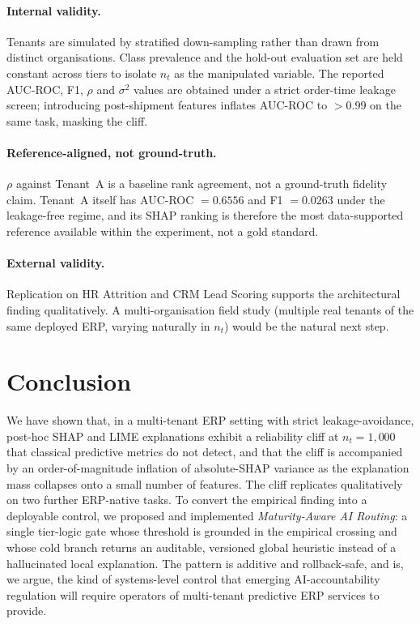 \documentclass[conference]{IEEEtran}
\newcommand{\auc}{AUC\nobreakdash-ROC}
\newcommand{\nT}{n_t}
\begin{document}
\paragraph*{Internal validity.} Tenants are simulated by stratified
down-sampling rather than drawn from distinct organisations. Class
prevalence and the hold-out evaluation set are held constant across
tiers to isolate $\nT$ as the manipulated variable. The reported
\auc{}, F1, $\rho$ and $\sigma^2$ values are obtained under a strict
order-time leakage screen; introducing post-shipment features inflates
\auc{} to $> 0.99$ on the same task, masking the cliff.

\paragraph*{Reference-aligned, not ground-truth.} $\rho$ against
Tenant~A is a baseline rank agreement, not a ground-truth fidelity
claim. Tenant~A itself has \auc{} $= 0.6556$ and F1 $= 0.0263$ under the
leakage-free regime, and its SHAP ranking is therefore the most
data-supported reference available within the experiment, not a gold
standard.

\paragraph*{External validity.} Replication on HR Attrition and CRM
Lead Scoring supports the architectural finding qualitatively. A
multi-organisation field study (multiple real tenants of the same
deployed ERP, varying naturally in $\nT$) would be the natural next
step.

\section{Conclusion}
\label{sec:conclusion}

We have shown that, in a multi-tenant ERP setting with strict
leakage-avoidance, post-hoc SHAP and LIME explanations exhibit a
reliability cliff at $\nT = 1{,}000$ that classical predictive metrics
do not detect, and that the cliff is accompanied by an order-of-magnitude
inflation of absolute-SHAP variance as the explanation mass collapses
onto a small number of features. The cliff replicates qualitatively on
two further ERP-native tasks. To convert the empirical finding into a
deployable control, we proposed and implemented \emph{Maturity-Aware AI
Routing}: a single tier-logic gate whose threshold is grounded in the
empirical crossing and whose cold branch returns an auditable, versioned
global heuristic instead of a hallucinated local explanation. The
pattern is additive and rollback-safe, and is, we argue, the kind of
systems-level control that emerging AI-accountability regulation will
require operators of multi-tenant predictive ERP services to provide.
\end{document}

